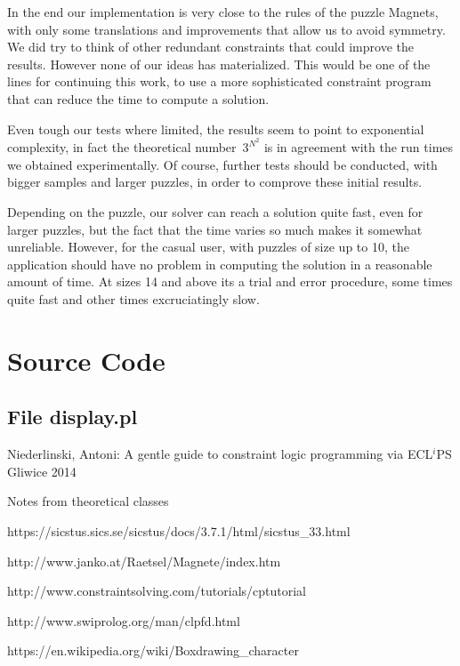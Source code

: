 \documentclass{llncs}
\begin{document}
In the end our implementation is very close to the rules of the puzzle Magnets, with only some translations and improvements that allow us to avoid symmetry. We did try to think of other redundant constraints that could improve the results. However none of our ideas has materialized. This would be one of the lines for continuing this work, to use a more sophisticated constraint program that can reduce the time to compute a solution.

Even tough our tests where limited, the results seem to point to exponential complexity, in fact the theoretical number~$3^{N^2}$ is in agreement with the run times we obtained experimentally. Of course, further tests should be conducted, with bigger samples and larger puzzles, in order to comprove these initial results.

Depending on the puzzle, our solver can reach a solution quite fast, even for larger puzzles, but the fact that the time varies so much makes it somewhat unreliable. However, for the casual user, with puzzles of size up to 10, the application should have no problem in computing the solution in a reasonable amount of time. At sizes 14 and above its a trial and error procedure, some times quite fast and other times excruciatingly slow.

\appendix
\section{Source Code}
\subsection{File display.pl}



\begin{thebibliography}{}

Niederlinski, Antoni:
A gentle guide to constraint logic programming
via ECL$^i$PS
Gliwice 2014

Notes from theoretical classes

https://sicstus.sics.se/sicstus/docs/3.7.1/html/sicstus\_33.html

http://www.janko.at/Raetsel/Magnete/index.htm

http://www.constraintsolving.com/tutorials/cp\-tutorial

http://www.swi\-prolog.org/man/clpfd.html

https://en.wikipedia.org/wiki/Box\-drawing\_character

\end{thebibliography}
\end{document}
